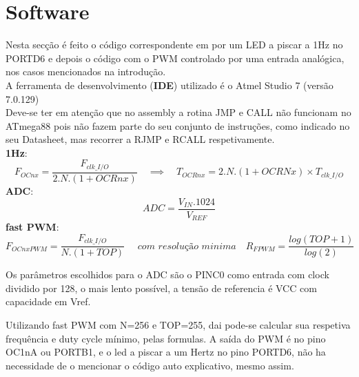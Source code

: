 \documentclass[titlepage, a4paper, 10pt, reqno, openany]{report}
\begin{document}
\section{Software}
Nesta sec\c{c}\~{a}o \'{e} feito o c\'{o}digo correspondente em por um LED a piscar a 1Hz no PORTD6 e depois o código com o PWM controlado por uma entrada analógica, nos casos mencionados na introdu\c{c}\~{a}o.  \\
A ferramenta de desenvolvimento ({\bf IDE}) utilizado \'{e} o Atmel Studio 7 (vers\~{a}o 7.0.129) \\
Deve-se ter em aten\c{c}\~{a}o que no assembly a rotina JMP e CALL n\~{a}o funcionam no ATmega88 pois n\~{a}o fazem parte do seu conjunto de instru\c{c}\~{o}es, como indicado no seu Datasheet, mas recorrer a RJMP e RCALL respetivamente. \\
{\bf 1Hz}:	
\begin{equation}
\boxed{F_{OCnx}=\frac{F_{clk\_I/O}}{2.N.(1+{OCRnx})}} \quad
\implies \quad {T_{OCRnx}=2.N.(1+OCRNx)\times T_{clk\_I/O}}
\end{equation}
{\bf ADC}:
\[ \boxed{ADC=\frac{V_{IN}.1024}{V_{REF}}} \]
{\bf fast PWM}:
\[ \boxed{F_{OCnxPWM}=\frac{F_{clk\_I/O}}{N.(1+{TOP})}} \quad \textit{ com resolu\c{c}\~{a}o minima} \quad \boxed{R_{FPWM}=\frac{log(TOP+1)}{log(2)}} \] \par
Os parâmetros escolhidos para o ADC s\~{a}o o PINC0 como entrada com clock dividido por 128, o mais lento poss\'{i}vel, a tens\~{a}o de referencia \'{e} VCC com capacidade em Vref. \par
Utilizando fast PWM com N=256 e TOP=255, dai pode-se calcular sua respetiva frequ\^{e}ncia e duty cycle mínimo, pelas formulas.
A saída do PWM \'{e} no pino OC1nA ou PORTB1, e o led a piscar a um Hertz no pino PORTD6, n\~{a}o ha necessidade de o mencionar o c\'{o}digo auto explicativo, mesmo assim.
\end{document}
